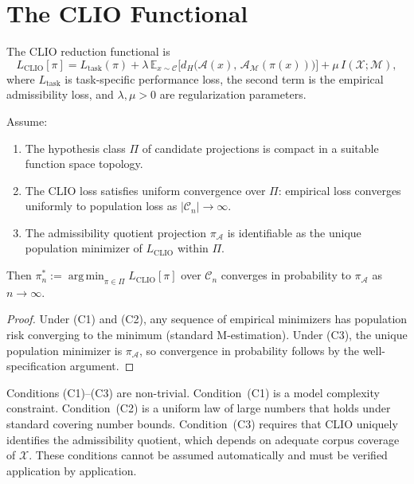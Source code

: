 \documentclass[12pt, a4paper, oneside]{book}
\newcommand{\Adm}{\mathcal{A}}
\newcommand{\X}{\mathcal{X}}
\newcommand{\M}{\mathcal{M}}
\newcommand{\C}{\mathcal{C}}
\newcommand{\proj}{\pi}
\newcommand{\projA}{\pi_{\!\Adm}}
\newcommand{\dH}{d_H}
\DeclareMathOperator{\argmin}{arg\,min}
\begin{document}
\section{The CLIO Functional}

\begin{definition}
\label{def:clio}
The CLIO reduction functional is
\[
  L_{\mathrm{CLIO}}[\proj]
  = L_{\mathrm{task}}(\proj)
  + \lambda\, \mathbb{E}_{x \sim \C}\bigl[\dH\bigl(\Adm(x),\,
    \Adm_\M(\proj(x))\bigr)\bigr]
  + \mu\, I(\X;\M),
\]
where $L_{\mathrm{task}}$ is task-specific performance loss,
the second term is the empirical admissibility loss, and $\lambda,\mu>0$
are regularization parameters.
\end{definition}

\begin{theorem}
\label{thm:clio-convergence}
Assume:
\begin{enumerate}
  \item[(C1)] The hypothesis class $\Pi$ of candidate projections is
    compact in a suitable function space topology.
  \item[(C2)] The CLIO loss satisfies uniform convergence over $\Pi$:
    empirical loss converges uniformly to population loss as
    $|\C_n| \to \infty$.
  \item[(C3)] The admissibility quotient projection $\projA$ is
    identifiable as the unique population minimizer of $L_{\mathrm{CLIO}}$
    within $\Pi$.
\end{enumerate}
Then $\proj_n^* := \argmin_{\proj \in \Pi} L_{\mathrm{CLIO}}[\proj]$
over $\C_n$ converges in probability to $\projA$ as $n \to \infty$.
\end{theorem}

\begin{proof}
Under (C1) and (C2), any sequence of empirical minimizers has population
risk converging to the minimum (standard M-estimation). Under (C3), the
unique population minimizer is $\projA$, so convergence in probability
follows by the well-specification argument.
\end{proof}

\begin{remark}
Conditions (C1)--(C3) are non-trivial. Condition~(C1) is a model
complexity constraint. Condition~(C2) is a uniform law of large numbers
that holds under standard covering number bounds. Condition~(C3) requires
that CLIO uniquely identifies the admissibility quotient, which depends on
adequate corpus coverage of $\X$. These conditions cannot be assumed
automatically and must be verified application by application.
\end{remark}
\end{document}
